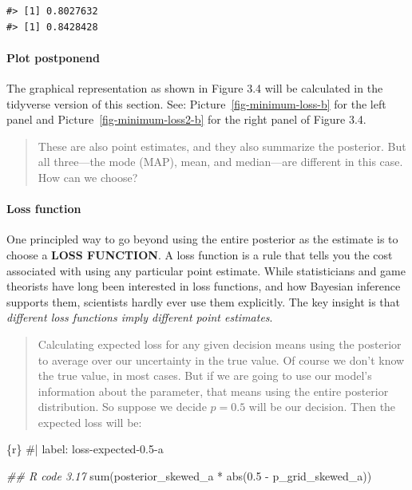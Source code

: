 \documentclass[
  letterpaper,
  DIV=11,
  numbers=noendperiod]{scrreprt}
\let\oldparagraph\paragraph
\renewcommand{\paragraph}[1]{\oldparagraph{#1}\mbox{}}
\newenvironment{Shaded}{\begin{snugshade}}{\end{snugshade}}
\newcommand{\CommentTok}[1]{\textcolor[rgb]{0.37,0.37,0.37}{#1}}
\newcommand{\DocumentationTok}[1]{\textcolor[rgb]{0.37,0.37,0.37}{\textit{#1}}}
\newcommand{\FloatTok}[1]{\textcolor[rgb]{0.68,0.00,0.00}{#1}}
\newcommand{\FunctionTok}[1]{\textcolor[rgb]{0.28,0.35,0.67}{#1}}
\newcommand{\InformationTok}[1]{\textcolor[rgb]{0.37,0.37,0.37}{#1}}
\newcommand{\NormalTok}[1]{\textcolor[rgb]{0.00,0.23,0.31}{#1}}
\newcommand{\SpecialCharTok}[1]{\textcolor[rgb]{0.37,0.37,0.37}{#1}}
\begin{document}
\begin{verbatim}
#> [1] 0.8027632
#> [1] 0.8428428
\end{verbatim}

\hypertarget{plot-postponend}{%
\paragraph{Plot postponend}\label{plot-postponend}}

The graphical representation as shown in Figure 3.4 will be calculated
in the tidyverse version of this section. See:
Picture~\ref{fig-minimum-loss-b} for the left panel and
Picture~\ref{fig-minimum-loss2-b} for the right panel of Figure 3.4.

\begin{quote}
These are also point estimates, and they also summarize the posterior.
But all three---the mode (MAP), mean, and median---are different in this
case. How can we choose?
\end{quote}

\hypertarget{loss-function}{%
\paragraph{Loss function}\label{loss-function}}

One principled way to go beyond using the entire posterior as the
estimate is to choose a \textbf{LOSS FUNCTION}. A loss function is a
rule that tells you the cost associated with using any particular point
estimate. While statisticians and game theorists have long been
interested in loss functions, and how Bayesian inference supports them,
scientists hardly ever use them explicitly. The key insight is that
\emph{different loss functions imply different point estimates}.

\begin{quote}
Calculating expected loss for any given decision means using the
posterior to average over our uncertainty in the true value. Of course
we don't know the true value, in most cases. But if we are going to use
our model's information about the parameter, that means using the entire
posterior distribution. So suppose we decide \(p = 0.5\) will be our
decision. Then the expected loss will be:
\end{quote}

\begin{Shaded}
\begin{Highlighting}[]
\InformationTok{\textasciigrave{}\textasciigrave{}\textasciigrave{}\{r\}}
\CommentTok{\#| label: loss{-}expected{-}0.5{-}a}

\DocumentationTok{\#\# R code 3.17}
\FunctionTok{sum}\NormalTok{(posterior\_skewed\_a }\SpecialCharTok{*} \FunctionTok{abs}\NormalTok{(}\FloatTok{0.5} \SpecialCharTok{{-}}\NormalTok{ p\_grid\_skewed\_a))}
\InformationTok{\textasciigrave{}\textasciigrave{}\textasciigrave{}}
\end{Highlighting}
\end{Shaded}
\end{document}
